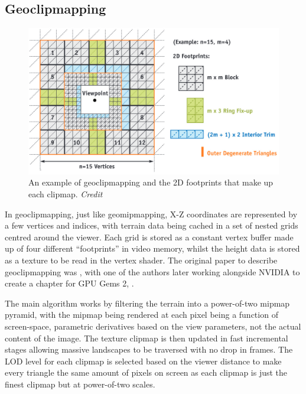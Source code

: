 \documentclass[notitlepage,12pt]{article}
\begin{document}
\subsection{Geoclipmapping} \label{geoclipmap}

\begin{figure}[ht]
  \centering
  \includegraphics[width=1.0\textwidth]{geoclipmapping_footprints.png}
  \caption{An example of geoclipmapping and the 2D footprints that make up each clipmap. \textit{Credit \cite{geoclipmappingGPUGems}}}
\end{figure}

In geoclipmapping, just like geomipmapping, X-Z coordinates are represented by a few vertices and indices, with terrain data being cached in a set of nested grids centred around the viewer. Each grid is stored as a constant vertex buffer made up of four different ``footprints'' in video memory, whilst the height data is stored as a texture to be read in the vertex shader. The original paper to describe geoclipmapping was \cite{geoclipmapping}, with one of the authors later working alongside NVIDIA to create a chapter for GPU Gems 2, \cite{geoclipmappingGPUGems}.

The main algorithm works by filtering the terrain into a power-of-two mipmap pyramid, with the mipmap being rendered at each pixel being a function of screen-space, parametric derivatives based on the view parameters, not the actual content of the image. The texture clipmap is then updated in fast incremental stages allowing massive landscapes to be traversed with no drop in frames. The LOD level for each clipmap is selected based on the viewer distance to make every triangle the same amount of pixels on screen as each clipmap is just the finest clipmap but at power-of-two scales.
\end{document}
